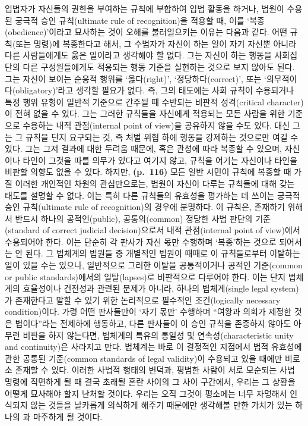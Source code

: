 입법자가 자신들의 권한을 부여하는 규칙에 부합하여 입법 활동을 하거나,
법원이 수용된 궁극적 승인 규칙(ultimate rule of recognition)을 적용할
때, 이를 `복종(obedience)'이라고 묘사하는 것이 오해를 불러일으키는
이유는 다음과 같다. 어떤 규칙(또는 명령)에 복종한다고 해서, 그 수범자가
자신이 하는 일이 자기 자신뿐 아니라 다른 사람들에게도 옳은 일이라고
생각해야 할  없다. 그는 자신이 하는 행동을 사회집단의
다른 구성원들에게도 적용되는 행동 기준을 실현하는 것으로 보지 않아도
된다. 그는 자신이 보이는 순응적 행위를 `옳다(right)',
`정당하다(correct)', 또는 `의무적이다(obligatory)'라고 생각할 필요가
없다. 즉, 그의 태도에는 사회 규칙이 수용되거나 특정 행위 유형이 일반적
기준으로 간주될 때 수반되는 비판적 성격(critical character)이 전혀 없을
수 있다. 그는 그러한 규칙들을 자신에게 적용되는 모든 사람을 위한
기준으로 수용하는 내적 관점(internal point of view)을 공유하지 않을 수도
있다. 대신 그는 그 규칙을 단지  요구되는 것, 즉 처벌
위협 하에 행동을 강제하는 것으로만 여길 수 있다. 그는 그저 결과에 대한
두려움 때문에, 혹은 관성에 따라 복종할 수 있으며, 자신이나 타인이 그것을
따를 의무가 있다고 여기지 않고, 규칙을 어기는 자신이나 타인을 비판할
의향도 없을 수 있다. 하지만, \textbf{(p.~116)} 모든 일반 시민이 규칙에
복종할 때 가질  이러한 개인적인 차원의
관심만으로는, 법원이 자신이 다루는 규칙들에 대해 갖는 태도를 설명할 수
없다. 이는 특히 다른 규칙들의 유효성을 평가하는 데 쓰이는 궁극적 승인
규칙(ultimate rule of recognition)의 경우에 분명하다. 이 규칙은,
존재하기 위해서 반드시 하나의 공적인(public), 공통의(common) 정당한 사법
판단의 기준(standard of correct judicial decision)으로서 내적
관점(internal point of view)에서 수용되어야 한다. 이는 단순히 각 판사가
자신 몫만 수행하며 `복종'하는 것으로 되어서는 안 된다. 그 법체계의
법원들 중 개별적인 법원이 때때로 이 규칙들로부터 이탈하는 일이 있을 수는
있으나, 일반적으로 그러한 이탈을 공통적이거나 공적인 기준(common or
public standards)에서의 일탈(lapses)로 비판적으로 다루어야 한다. 이는
단지 법체계의 효율성이나 건전성과 관련된 문제가 아니라, 하나의
법체계(single legal system)가 존재한다고 말할 수 있기 위한 논리적으로
필수적인 조건(logically necessary condition)이다. 가령 어떤 판사들만이
`자기 몫만' 수행하며 ``여왕과 의회가 제정한 것은 법이다''라는 전제하에
행동하고, 다른 판사들이 이 승인 규칙을 존중하지 않아도 아무런 비판을
하지 않는다면, 법체계의 특유의 통일성 및 연속성(characteristic unity and
continuity)은 사라지고 만다. 법체계는 바로 이 결정적인 지점에서 법적
유효성에 관한 공통된 기준(common standards of legal validity)이 수용되고
있을 때에만 비로소 존재할 수 있다. 이러한 사법적 행태의 변덕과, 평범한
사람이 서로 모순되는 사법 명령에 직면하게 될 때 결국 초래될 혼란 사이의
그 사이 구간에서, 우리는 그 상황을 어떻게 묘사해야 할지 난처할 것이다.
우리는 오직 그것이 평소에는 너무 자명해서 인식되지 않는 것들을 날카롭게
의식하게 해주기 때문에만 생각해볼 만한 가치가 있는 하나의 과 마주하게 될 것이다.

